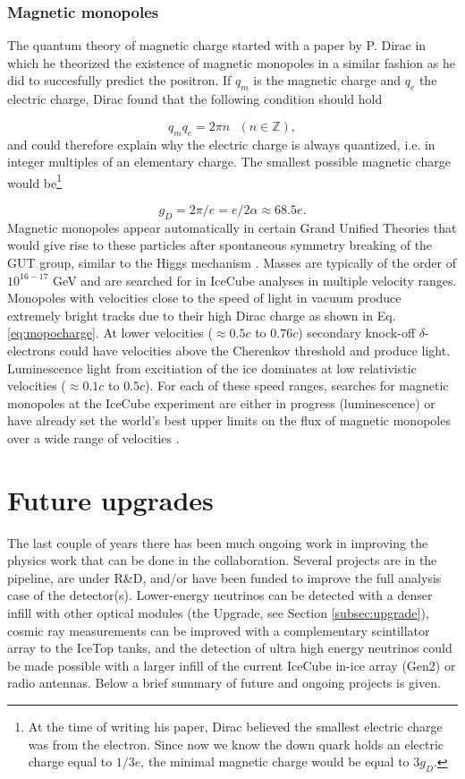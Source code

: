 \subsubsection{Magnetic monopoles}
The quantum theory of magnetic charge started with a paper by P. Dirac \cite{Dirac60} in which he theorized the existence of magnetic monopoles in a similar fashion as he did to succesfully predict the positron. If $q_m$ is the magnetic charge and $q_e$ the electric charge, Dirac found that the following condition should hold

\begin{equation}
q_m q_e = 2\pi n \ \ \ (n \in \mathbb{Z}),
\end{equation}
and could therefore explain why the electric charge is always quantized, i.e. in integer multiples of an elementary charge. The smallest possible magnetic charge  would be\footnote{At the time of writing his paper, Dirac believed the smallest electric charge was from the electron. Since now we know the down quark holds an electric charge equal to $1/3 e$, the minimal magnetic charge would be equal to $3g_D$.} 

\begin{equation}
\label{eq:mopocharge}
g_D = 2\pi/e = e/2\alpha \approx 68.5e.
\end{equation}
Magnetic monopoles appear automatically in certain Grand Unified Theories that would give rise to these particles after spontaneous symmetry breaking of the GUT group, similar to the Higgs mechanism \cite{HOOFT1974276,Polyakov:1974ek}. Masses are typically of the order of $10^{16-17}$ GeV and are searched for in IceCube analyses in multiple velocity ranges. Monopoles with velocities close to the speed of light in vacuum produce extremely bright tracks due to their high Dirac charge as shown in Eq. \ref{eq:mopocharge}. At lower velocities ($\approx 0.5c$ to $0.76c$) secondary knock-off $\delta$-electrons could have velocities above the Cherenkov threshold and produce light. Luminescence light from excitiation of the ice dominates at low relativistic velocities ($\approx 0.1c$ to $0.5c$). For each of these speed ranges, searches for magnetic monopoles at the IceCube experiment are either in progress (luminescence) or have already set the world's best upper limits on the flux of magnetic monopoles over a wide range of velocities \cite{Aartsen:2014awd}.

\section{Future upgrades}
The last couple of years there has been much ongoing work in improving the physics work that can be done in the collaboration. Several projects are in the pipeline, are under R\&D, and/or have been funded to improve the full analysis case of the detector(s). Lower-energy neutrinos can be detected with a denser infill with other optical modules (the Upgrade, see Section \ref{subsec:upgrade}), cosmic ray measurements can be improved with a complementary scintillator array to the IceTop tanks, and the detection of ultra high energy neutrinos could be made possible with a larger infill of the current IceCube in-ice array (Gen2) or radio antennas. Below a brief summary of future and ongoing projects is given.

